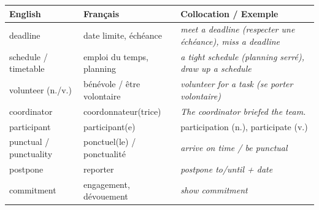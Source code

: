 \documentclass[11pt]{article}
\newcommand{\cle}[1]{{\popxbold\color{popdark}#1}}
\newcommand{\eng}[1]{\ifmmode\text{\textit{#1}}\else\begingroup\selectlanguage{english}\itshape #1\endgroup\fi}
\begin{document}
\begin{aretenir}
\begin{center}
\begin{tabularx}{\linewidth}{|X|X|X|}
\hline
\rowcolor{popblueL} \textbf{English} & \textbf{Français} & \textbf{Collocation / Exemple} \\
\hline
\cle{deadline} & date limite, échéance & \eng{meet a deadline} (respecter une échéance), \eng{miss a deadline} \\
\cle{schedule} / \cle{timetable} & emploi du temps, planning & \eng{a tight schedule} (planning serré), \eng{draw up a schedule} \\
\cle{volunteer} (n./v.) & bénévole / être volontaire & \eng{volunteer for a task} (se porter volontaire) \\
\cle{coordinator} & coordonnateur(trice) & \eng{The coordinator briefed the team.} \\
\cle{participant} & participant(e) & \cle{participation} (n.), \cle{participate} (v.) \\
\cle{punctual} / \cle{punctuality} & ponctuel(le) / ponctualité & \eng{arrive on time} / \eng{be punctual} \\
\cle{postpone} & reporter & \eng{postpone to/until} + date \\
\cle{commitment} & engagement, dévouement & \eng{show commitment} \\
\hline
\end{tabularx}
\end{center}
\end{aretenir}
\end{document}
